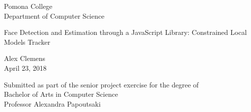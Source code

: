 \documentclass{article}
\begin{document}
\begin{center}

\large {Pomona College} \\
\large {Department of Computer Science} \\[2.0 em]

\vspace{40mm}

\LARGE {Face Detection and Estimation through a JavaScript Library: Constrained Local Models Tracker}\\

\vspace{15mm}

\large{Alex Clemens}\\[0.8 em]
\large{April 23, 2018}\\

\vspace{80mm}

\large{Submitted as part of the senior project exercise for the degree of}\\
\large{Bachelor of Arts in Computer Science}\\[0.6 em]
\large{Professor Alexandra Papoutsaki}\\

\end{center}


\newpage
\end{document}
